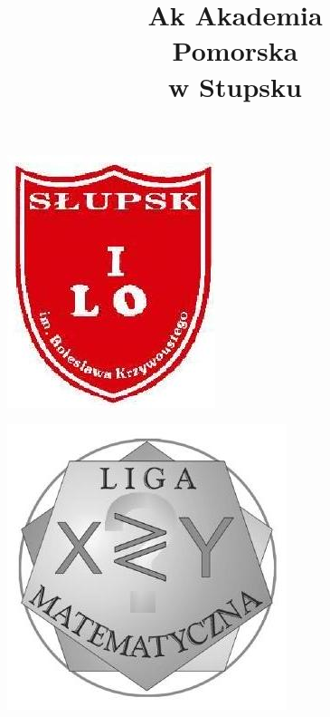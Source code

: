 \documentclass[10pt]{article}
\title{Ak Akademia \\
 Pomorska \\
 w Stupsku }
\author{}
\date{}
\begin{document}
\maketitle
\begin{center}
\includegraphics[max width=\textwidth]{2024_11_21_6db36f485c30a3a4f8d0g-1}
\end{center}

\begin{center}
\includegraphics[max width=\textwidth]{2024_11_21_6db36f485c30a3a4f8d0g-1(1)}
\end{center}
\end{document}
